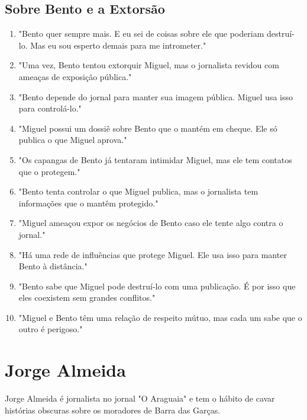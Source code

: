 \subsection*{Sobre Bento e a Extorsão}
\begin{enumerate}
    \item "Bento quer sempre mais. E eu sei de coisas sobre ele que poderiam destruí-lo. Mas eu sou esperto demais para me intrometer."
    \item "Uma vez, Bento tentou extorquir Miguel, mas o jornalista revidou com ameaças de exposição pública."
    \item "Bento depende do jornal para manter sua imagem pública. Miguel usa isso para controlá-lo."
    \item "Miguel possui um dossiê sobre Bento que o mantém em cheque. Ele só publica o que Miguel aprova."
    \item "Os capangas de Bento já tentaram intimidar Miguel, mas ele tem contatos que o protegem."
    \item "Bento tenta controlar o que Miguel publica, mas o jornalista tem informações que o mantêm protegido."
    \item "Miguel ameaçou expor os negócios de Bento caso ele tente algo contra o jornal."
    \item "Há uma rede de influências que protege Miguel. Ele usa isso para manter Bento à distância."
    \item "Bento sabe que Miguel pode destruí-lo com uma publicação. É por isso que eles coexistem sem grandes conflitos."
    \item "Miguel e Bento têm uma relação de respeito mútuo, mas cada um sabe que o outro é perigoso."
\end{enumerate}

\section{Jorge Almeida}
Jorge Almeida é jornalista no jornal "O Araguaia" e tem o hábito de cavar histórias obscuras sobre os moradores de Barra das Garças.

